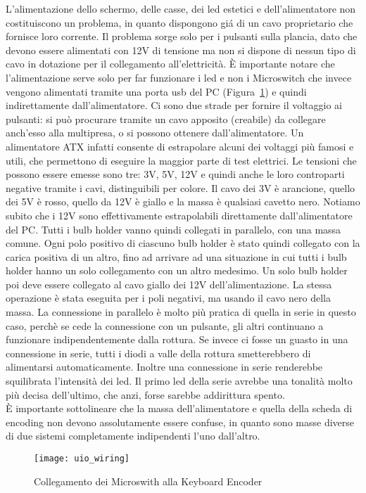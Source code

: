 L'alimentazione dello schermo, delle casse, dei led estetici e dell'alimentatore non costituiscono un problema, in quanto dispongono giá di un cavo proprietario che fornisce loro corrente. Il problema sorge solo per i pulsanti sulla plancia, dato che devono essere alimentati con 12V di tensione ma non si dispone di nessun tipo di cavo in dotazione per il collegamento all’elettricità. È importante notare che l’alimentazione serve solo per far funzionare i led e non i Microswitch che invece vengono alimentati tramite una porta usb del PC (Figura~\ref{fig:uio}) e quindi indirettamente dall’alimentatore. Ci sono due strade per fornire il voltaggio ai pulsanti: si può procurare tramite un cavo apposito (creabile) da collegare anch’esso alla multipresa, o si possono ottenere dall’alimentatore. Un alimentatore ATX infatti consente di estrapolare alcuni dei voltaggi più famosi e utili, che permettono di eseguire la maggior parte di test elettrici. Le tensioni che possono essere emesse sono tre: 3V, 5V, 12V  e quindi anche le loro controparti negative tramite i cavi, distinguibili per colore. Il cavo dei 3V è arancione, quello dei 5V è rosso, quello da 12V è giallo e la massa è qualsiasi cavetto nero. Notiamo subito che i 12V sono effettivamente estrapolabili direttamente dall’alimentatore del PC. Tutti i bulb holder vanno quindi collegati in parallelo, con una massa comune. Ogni polo positivo di ciascuno bulb holder è stato quindi collegato con la carica positiva di un altro, fino ad arrivare ad una situazione in cui tutti i bulb holder hanno un solo collegamento con un altro medesimo. Un solo bulb holder poi deve essere collegato al cavo giallo dei 12V dell’alimentazione. La stessa operazione è stata eseguita per i poli negativi, ma usando il cavo nero della massa. La connessione in parallelo è molto più pratica di quella in serie in questo caso, perchè se cede la connessione con un pulsante, gli altri continuano a funzionare indipendentemente dalla rottura. Se invece ci fosse un guasto in una connessione in serie, tutti i diodi a valle della rottura smetterebbero di alimentarsi automaticamente. Inoltre una connessione in serie renderebbe squilibrata l’intensità dei led. Il primo led della serie avrebbe una tonalità molto più decisa dell’ultimo, che anzi, forse sarebbe addirittura spento.\\È importante sottolineare che la massa dell’alimentatore e quella della scheda di encoding non devono assolutamente essere confuse, in quanto sono masse diverse di due sistemi completamente indipendenti l’uno dall’altro.
\begin{figure}[!ht]
\texttt{[image: uio\_wiring]}
\centering
\caption{Collegamento dei Microswith alla Keyboard Encoder}
\label{fig:uio}
\end{figure}
\newpage
